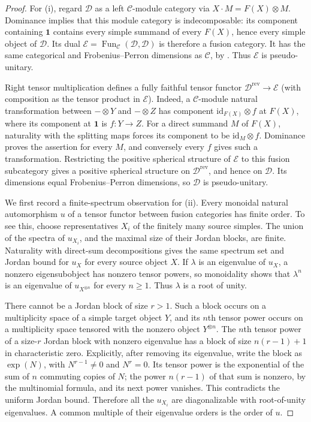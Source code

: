 \begin{proof}
For (i), regard $\mathcal D$ as a left $\mathcal C$-module category via
$X\cdot M=F(X)\otimes M$. Dominance implies that this module category
is indecomposable: its component containing $\mathbf1$ contains every
simple summand of every $F(X)$, hence every simple object of $\mathcal D$.
Its dual $\mathcal E=\operatorname{Fun}_{\mathcal C}
(\mathcal D,\mathcal D)$ is therefore a fusion category.
It has the same categorical and Frobenius--Perron dimensions as
$\mathcal C$, by \cite[Corollaries~9.3.3 and~7.16.7 and Proposition~9.3.9]{EGNO}. Thus $\mathcal E$ is pseudo-unitary.

Right tensor multiplication defines a fully faithful tensor functor
$\mathcal D^{\mathrm{rev}}\to\mathcal E$ (with composition as the
tensor product in $\mathcal E$). Indeed, a $\mathcal C$-module natural
transformation between $-\otimes Y$ and $-\otimes Z$ has component
$\mathrm{id}_{F(X)}\otimes f$ at $F(X)$, where its component at
$\mathbf1$ is $f\colon Y\to Z$. For a direct summand $M$ of $F(X)$,
naturality with the splitting maps forces its component to be
$\mathrm{id}_M\otimes f$. Dominance proves the assertion for every
$M$, and conversely every $f$ gives such a transformation.
Restricting the positive spherical structure of $\mathcal E$ to this
fusion subcategory gives a positive spherical structure on
$\mathcal D^{\mathrm{rev}}$, and hence on $\mathcal D$. Its dimensions
equal Frobenius--Perron dimensions, so $\mathcal D$ is pseudo-unitary.

We first record a finite-spectrum observation for (ii). Every monoidal
natural automorphism $u$ of a tensor functor between fusion categories
has finite order. To see this, choose representatives $X_i$ of the
finitely many source simples. The union of the spectra of $u_{X_i}$,
and the maximal size of their Jordan blocks, are finite. Naturality
with direct-sum decompositions gives the same spectrum set and Jordan
bound for $u_X$ for every source object $X$. If $\lambda$ is an
eigenvalue of $u_X$, a nonzero eigensubobject has nonzero tensor powers,
so monoidality shows that $\lambda^n$ is an eigenvalue of $u_{X^{\otimes n}}$
for every $n\geq1$. Thus $\lambda$ is a root of unity.

There cannot be a Jordan block of size $r>1$. Such a block occurs on
a multiplicity space of a simple target object $Y$, and its $n$th
tensor power occurs on a multiplicity space tensored with the nonzero
object $Y^{\otimes n}$. The $n$th tensor power of a size-$r$ Jordan
block with nonzero eigenvalue has a block of size $n(r-1)+1$ in
characteristic zero. Explicitly, after removing its eigenvalue, write
the block as $\exp(N)$, with $N^{r-1}\ne0$ and $N^r=0$.
Its tensor power is the exponential of the sum of $n$ commuting
copies of $N$; the power $n(r-1)$ of that sum is nonzero, by the
multinomial formula, and its next power vanishes. This contradicts
the uniform Jordan bound. Therefore all the $u_{X_i}$ are diagonalizable
with root-of-unity eigenvalues. A common multiple of their eigenvalue
orders is the order of $u$.


\end{proof}
